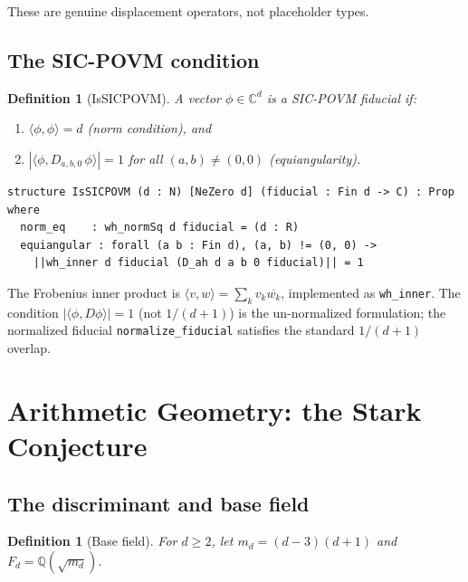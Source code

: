 \documentclass[12pt,a4paper]{article}
\newtheorem{definition}[theorem]{Definition}
\begin{document}
These are genuine displacement operators, not placeholder types.

\subsection{The SIC-POVM condition}

\begin{definition}[IsSICPOVM]
A vector $\phi \in \mathbb{C}^d$ is a \emph{SIC-POVM fiducial} if:
\begin{enumerate}[label=(\roman*)]
  \item $\langle \phi, \phi \rangle = d$ \quad (norm condition), and
  \item $|\langle \phi, D_{a,b,0}\,\phi \rangle| = 1$ for all $(a,b) \neq (0,0)$ \quad (equiangularity).
\end{enumerate}
\end{definition}

\begin{lstlisting}
structure IsSICPOVM (d : N) [NeZero d] (fiducial : Fin d -> C) : Prop where
  norm_eq    : wh_normSq d fiducial = (d : R)
  equiangular : forall (a b : Fin d), (a, b) != (0, 0) ->
    ||wh_inner d fiducial (D_ah d a b 0 fiducial)|| = 1
\end{lstlisting}

The Frobenius inner product is $\langle v, w \rangle = \sum_k v_k \overline{w_k}$,
implemented as \texttt{wh\_inner}.  The condition $|\langle\phi, D\phi\rangle|=1$
(not $1/(d+1)$) is the un-normalized formulation; the normalized fiducial
\texttt{normalize\_fiducial} satisfies the standard $1/(d+1)$ overlap.

\section{Arithmetic Geometry: the Stark Conjecture}
\label{sec:stark}

\subsection{The discriminant and base field}

\begin{definition}[Base field]
For $d \geq 2$, let $m_d = (d-3)(d+1)$ and $F_d = \mathbb{Q}(\sqrt{m_d})$.
\end{definition}
\end{document}

